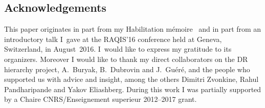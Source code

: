 \documentclass[pdftex]{sigma}
\numberwithin{equation}{section}
\newcommand{\<}{\left<}
\renewcommand{\>}{\right>}
\begin{document}
\subsection*{Acknowledgements} This paper originates in part from my Habilitation m\'emoire~\cite{Ros16} and in part from an introductory talk I~gave at the RAQIS'16 conference held at Geneva, Switzerland, in August~2016. I~would like to express my gratitude to its organizers. Moreover I would like to thank my direct collaborators on the DR hierarchy project, A.~Buryak, B.~Dubrovin and J.~Gu\'er\'e, and the people who supported us with advice and insight, among the others Dimitri Zvonkine, Rahul Pandharipande and Yakov Eliashberg. During this work I was partially supported by a Chaire CNRS/Enseignement superieur 2012--2017 grant.

\end{document}

